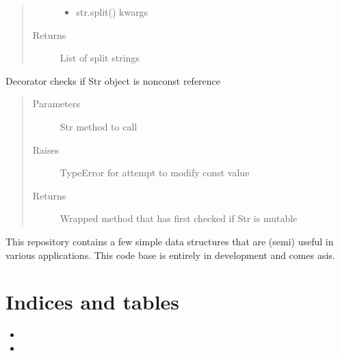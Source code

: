 \documentclass[letterpaper,10pt,english]{sphinxmanual}
\begin{document}
\begin{fulllineitems}
\begin{fulllineitems}
\begin{quote}
\begin{description}
\begin{itemize}
\item {} 
 \textendash{} str.split() kwargs

\end{itemize}

\item[{Returns}] \leavevmode
List of split strings

\end{description}\end{quote}

\end{fulllineitems}


\end{fulllineitems}


\begin{fulllineitems}
\label{\detokenize{api/mutable_string:data_structures.mutable_string.handle_const}}
Decorator checks if Str object is non\sphinxhyphen{}const reference
\begin{quote}\begin{description}
\item[{Parameters}] \leavevmode
{} \textendash{} Str method to call

\item[{Raises}] \leavevmode
TypeError for attempt to modify const value

\item[{Returns}] \leavevmode
Wrapped method that has first checked if Str is mutable

\end{description}\end{quote}

\end{fulllineitems}


This repository contains a few simple data structures that are (semi) useful in various applications. This code base is
entirely in development and comes as\sphinxhyphen{}is.


\chapter{Indices and tables}
\label{\detokenize{index:indices-and-tables}}\begin{itemize}
\item {} 

\item {} 

\end{itemize}
\end{document}
